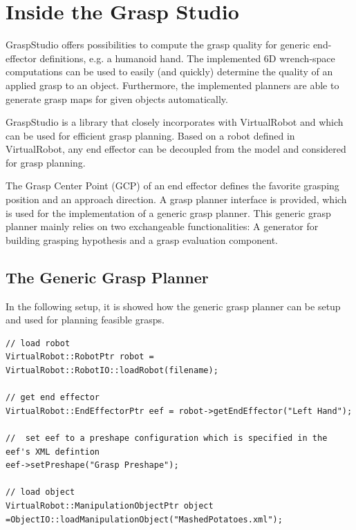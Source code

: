 \documentclass{book}
\begin{document}
\chapter{Inside the Grasp Studio}
GraspStudio offers possibilities to compute the grasp quality for generic end-effector definitions, e.g. a humanoid hand. The implemented 6D wrench-space computations can be used to easily (and quickly) determine the quality of an applied grasp to an object. Furthermore, the implemented planners are able to generate grasp maps for given objects automatically. \par GraspStudio is a library that closely incorporates with VirtualRobot and which can be used for efficient grasp planning. Based on a robot defined in VirtualRobot, any end effector can be decoupled from the model and considered for grasp planning. \par The Grasp Center Point (GCP) of an end effector defines the favorite grasping position and an approach direction. A grasp planner interface is provided, which is used for the implementation of a generic grasp planner. This generic grasp planner mainly relies on two exchangeable functionalities: A generator for building grasping hypothesis and a grasp evaluation component.

\section{The Generic Grasp Planner}
In the following setup, it is showed how the generic grasp planner can be setup and used for planning feasible grasps. 
\begin{lstlisting}
// load robot
VirtualRobot::RobotPtr robot = VirtualRobot::RobotIO::loadRobot(filename);

// get end effector
VirtualRobot::EndEffectorPtr eef = robot->getEndEffector("Left Hand");

//  set eef to a preshape configuration which is specified in the eef's XML defintion 
eef->setPreshape("Grasp Preshape");

// load object
VirtualRobot::ManipulationObjectPtr object =ObjectIO::loadManipulationObject("MashedPotatoes.xml");
\end{lstlisting}
\end{document}
